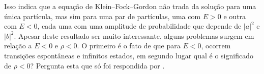 Isso indica que a equação de Klein--Fock--Gordon não trada da solução para uma única partícula, mas sim para uma par de partículas, uma com $E>0$ e outra com $E<0$, cada uma com uma amplitude de probabilidade que depende de $|a|^2$ e $|b|^2$. 
Apesar deste resultado ser muito interessante, alguns problemas surgem em relação a $E<0$ e $\rho < 0$. O primeiro é o fato de que para $E<0$, ocorrem transições espontâneas e infinitos estados, em segundo lugar qual é o significado de $\rho < 0$? Pergunta esta que só foi respondida por \textcite{Dirac}. 


